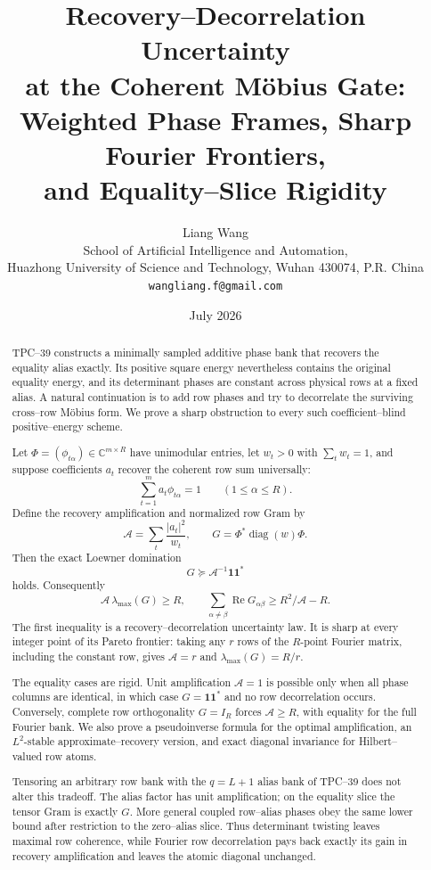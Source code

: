 \documentclass[11pt]{article}
\title{\textbf{Recovery--Decorrelation Uncertainty}\\
\textbf{at the Coherent M\"obius Gate:}\\
\textbf{Weighted Phase Frames, Sharp Fourier Frontiers,}\\
\textbf{and Equality--Slice Rigidity}}
\author{Liang Wang\\
\small School of Artificial Intelligence and Automation,\\[-0.2em]
\small Huazhong University of Science and Technology, Wuhan 430074, P.R. China\\
\small \texttt{wangliang.f@gmail.com}}
\date{July 2026}
\theoremstyle{definition}
\theoremstyle{remark}
\newcommand{\C}{\mathbb C}
\newcommand{\one}{\mathbf 1}
\newcommand{\cA}{\mathcal A}
\newcommand{\diag}{\operatorname{diag}}
\begin{document}
\maketitle

\begin{abstract}
TPC--39 constructs a minimally sampled additive phase bank that recovers
the equality alias exactly.  Its positive square energy nevertheless
contains the original equality energy, and its determinant phases are
constant across physical rows at a fixed alias.  A natural continuation
is to add row phases and try to decorrelate the surviving cross--row
M\"obius form.  We prove a sharp obstruction to every such
coefficient--blind positive--energy scheme.

Let \(\Phi=(\phi_{t\alpha})\in\C^{m\times R}\) have unimodular entries,
let \(w_t>0\) with \(\sum_tw_t=1\), and suppose coefficients \(a_t\)
recover the coherent row sum universally:
\[
 \sum_{t=1}^m a_t\phi_{t\alpha}=1
 \qquad(1\le\alpha\le R).
\]
Define the recovery amplification and normalized row Gram by
\[
 \cA=\sum_t\frac{|a_t|^2}{w_t},
 \qquad
 G=\Phi^*\diag(w)\Phi.
\]
Then the exact Loewner domination
\[
 \boxed{G\succeq\cA^{-1}\one\one^*}
\]
holds.  Consequently
\[
 \cA\,\lambda_{\max}(G)\ge R,
 \qquad
 \sum_{\alpha\ne\beta}\operatorname{Re}G_{\alpha\beta}
 \ge R^2/\cA-R.
\]
The first inequality is a recovery--decorrelation uncertainty law.  It is
sharp at every integer point of its Pareto frontier: taking any \(r\)
rows of the \(R\)-point Fourier matrix, including the constant row, gives
\(\cA=r\) and \(\lambda_{\max}(G)=R/r\).

The equality cases are rigid.  Unit amplification \(\cA=1\) is possible
only when all phase columns are identical, in which case
\(G=\one\one^*\) and no row decorrelation occurs.  Conversely, complete
row orthogonality \(G=I_R\) forces \(\cA\ge R\), with equality for the
full Fourier bank.  We also prove a pseudoinverse formula for the optimal
amplification, an \(L^2\)-stable approximate--recovery version, and exact
diagonal invariance for Hilbert--valued row atoms.

Tensoring an arbitrary row bank with the \(q=L+1\) alias bank of TPC--39
does not alter this tradeoff.  The alias factor has unit amplification;
on the equality slice the tensor Gram is exactly \(G\).  More general
coupled row--alias phases obey the same lower bound after restriction to
the zero--alias slice.  Thus determinant twisting leaves maximal row
coherence, while Fourier row decorrelation pays back exactly its gain in
recovery amplification and leaves the atomic diagonal unchanged.


\end{abstract}
\end{document}
